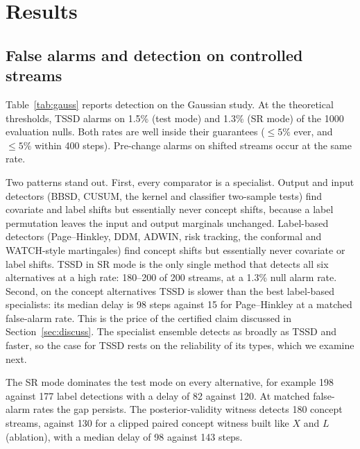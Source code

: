 \section{Results}
\label{sec:results}

\subsection{False alarms and detection on controlled streams}
\label{sec:detection}

Table~\ref{tab:gauss} reports detection on the Gaussian study. At the theoretical thresholds, TSSD alarms on 1.5\% (test mode) and 1.3\% (SR mode) of the 1000 evaluation nulls. Both rates are well inside their guarantees ($\le5\%$ ever, and $\le5\%$ within 400 steps). Pre-change alarms on shifted streams occur at the same rate.

Two patterns stand out. First, every comparator is a specialist. Output and input detectors (BBSD, CUSUM, the kernel and classifier two-sample tests) find covariate and label shifts but essentially never concept shifts, because a label permutation leaves the input and output marginals unchanged. Label-based detectors (Page--Hinkley, DDM, ADWIN, risk tracking, the conformal and WATCH-style martingales) find concept shifts but essentially never covariate or label shifts. TSSD in SR mode is the only single method that detects all six alternatives at a high rate: 180--200 of 200 streams, at a 1.3\% null alarm rate. Second, on the concept alternatives TSSD is slower than the best label-based specialists: its median delay is 98 steps against 15 for Page--Hinkley at a matched false-alarm rate. This is the price of the certified claim discussed in Section~\ref{sec:discuss}. The specialist ensemble detects as broadly as TSSD and faster, so the case for TSSD rests on the reliability of its types, which we examine next.

The SR mode dominates the test mode on every alternative, for example 198 against 177 label detections with a delay of 82 against 120. At matched false-alarm rates the gap persists. The posterior-validity witness detects 180 concept streams, against 130 for a clipped paired concept witness built like $X$ and $L$ (ablation), with a median delay of 98 against 143 steps.

